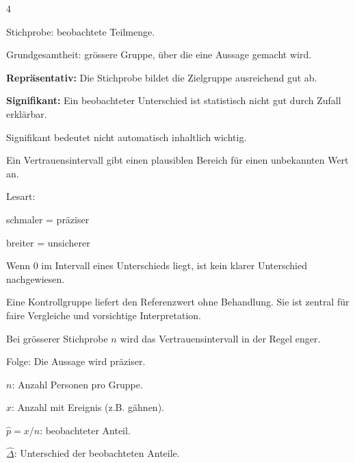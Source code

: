 \begin{landscape}
\begin{multicols*}{4}
\begin{cheatSheetBox}[title=Stichprobe und Grundgesamtheit]
Stichprobe:
beobachtete Teilmenge.

Grundgesamtheit:
grössere Gruppe, über die eine Aussage gemacht wird.
\end{cheatSheetBox}

\begin{cheatSheetBox}[title=Repräsentativ und signifikant]
\textbf{Repräsentativ:}
Die Stichprobe bildet die Zielgruppe ausreichend gut ab.

\textbf{Signifikant:}
Ein beobachteter Unterschied ist statistisch nicht gut durch Zufall erklärbar.

Signifikant bedeutet nicht automatisch inhaltlich wichtig.
\end{cheatSheetBox}

\begin{cheatSheetBox}[title=Vertrauensintervall (95\%)]
Ein Vertrauensintervall gibt einen plausiblen Bereich für einen unbekannten Wert an.

Lesart:
\begin{enumerate*}
\item schmaler = präziser
\item breiter = unsicherer
\end{enumerate*}

Wenn 0 im Intervall eines Unterschieds liegt,
ist kein klarer Unterschied nachgewiesen.
\end{cheatSheetBox}

\begin{cheatSheetBox}[title=Kontrollgruppe]
Eine Kontrollgruppe liefert den Referenzwert ohne Behandlung.
Sie ist zentral für faire Vergleiche und vorsichtige Interpretation.
\end{cheatSheetBox}

\begin{cheatSheetBox}[title=Einfluss von n]
Bei grösserer Stichprobe $n$ wird das Vertrauensintervall in der Regel enger.

Folge:
Die Aussage wird präziser.
\end{cheatSheetBox}

\begin{cheatSheetBox}[title=Symbolübersicht (Gähn-Beispiel)]
$n$: Anzahl Personen pro Gruppe.

$x$: Anzahl mit Ereignis (z.B. gähnen).

$\hat{p}=x/n$: beobachteter Anteil.

$\hat{\Delta}$: Unterschied der beobachteten Anteile.


\end{cheatSheetBox}
\end{multicols*}
\end{landscape}
